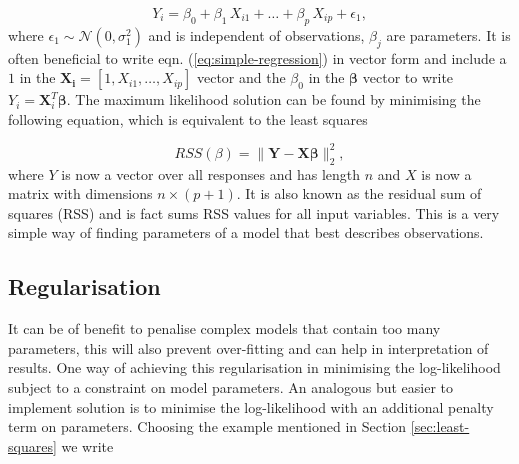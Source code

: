 \begin{equation}
  \label{eq:simple-regression}
  Y_i = \beta_0 + \beta_1 \, X_{i1}  + \ldots +\beta_p \, X_{ip}+ \epsilon_1,
\end{equation}
where $\epsilon_1 \sim \mathcal{N}(0, \sigma_1^2)$ and is independent of observations, $\beta_j$ are parameters. It is often beneficial to write eqn. (\ref{eq:simple-regression}) in vector form and include a $1$ in the $\mathbf{X_{i}} = [1, X_{i1}, \ldots , X_{ip}]$ vector and the $\beta_0$ in the $\mathbf{\beta}$ vector to write $Y_i = \mathbf{X}_i^T \mathbf{\beta}$. The maximum likelihood solution can be found by minimising the following equation, which is equivalent to the least squares


\begin{equation}
  \label{eq:rss-ls}
  RSS(\beta) = \lVert \mathbf{Y} - \mathbf{X}\mathbf{\beta}\lVert^2_2,
\end{equation}
where $Y$ is now a vector over all responses and has length $n$ and $X$ is now a matrix with dimensions $n \times (p + 1)$. It is also known as the residual sum of squares (RSS) and is fact sums RSS values for all input variables. This is a very simple way of finding parameters of a model that best describes observations.

\subsection{Regularisation}
\label{sec:penalisation}

It can be of benefit to penalise complex models that contain too many parameters, this will also prevent over-fitting and can help in interpretation of results. One way of achieving this regularisation in minimising the log-likelihood subject to a constraint on model parameters. An analogous but easier to implement solution is to minimise the log-likelihood with an additional penalty term on parameters. Choosing the example mentioned in Section \ref{sec:least-squares} we write

